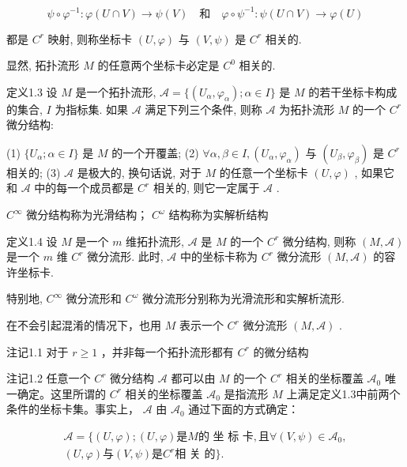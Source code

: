 $$
\psi \circ \varphi^ {- 1}: \varphi (U \cap V) \to \psi (V) \quad {\text {和}} \quad \varphi \circ \psi^ {- 1}: \psi (U \cap V) \to \varphi (U)
$$

都是  $C^r$  映射, 则称坐标卡  $(U,\varphi)$  与  $(V,\psi)$  是  $C^r$  相关的.

显然, 拓扑流形  $M$  的任意两个坐标卡必定是  $C^0$  相关的.

定义1.3 设  $M$  是一个拓扑流形,  $\mathcal{A} = \{(U_{\alpha}, \varphi_{\alpha}) ; \alpha \in I\}$  是  $M$  的若干坐标卡构成的集合,  $I$  为指标集. 如果  $\mathcal{A}$  满足下列三个条件, 则称  $\mathcal{A}$  为拓扑流形  $M$  的一个  $C^r$  微分结构:

(1)  $\{U_{\alpha}; \alpha \in I\}$  是  $M$  的一个开覆盖;  
(2)  $\forall \alpha, \beta \in I, (U_{\alpha}, \varphi_{\alpha})$  与  $(U_{\beta}, \varphi_{\beta})$  是  $C^r$  相关的;  
(3)  $\mathcal{A}$  是极大的, 换句话说, 对于  $M$  的任意一个坐标卡  $(U, \varphi)$ , 如果它和  $\mathcal{A}$  中的每一个成员都是  $C^r$  相关的, 则它一定属于  $\mathcal{A}$ .

$C^\infty$  微分结构称为光滑结构；  $C^\omega$  结构称为实解析结构

定义1.4 设  $M$  是一个  $m$  维拓扑流形,  $\mathcal{A}$  是  $M$  的一个  $C^r$  微分结构, 则称  $(M, \mathcal{A})$  是一个  $m$  维  $C^r$  微分流形. 此时,  $\mathcal{A}$  中的坐标卡称为  $C^r$  微分流形  $(M, \mathcal{A})$  的容许坐标卡.

特别地,  $C^\infty$  微分流形和  $C^\omega$  微分流形分别称为光滑流形和实解析流形.

在不会引起混淆的情况下，也用  $M$  表示一个  $C^r$  微分流形  $(M, \mathcal{A})$ .

注记1.1 对于  $r \geqslant 1$ ，并非每一个拓扑流形都有  $C^r$  的微分结构

注记1.2 任意一个  $C^r$  微分结构  $\mathcal{A}$  都可以由  $M$  的一个  $C^r$  相关的坐标覆盖  $\mathcal{A}_0$  唯一确定。这里所谓的  $C^r$  相关的坐标覆盖  $\mathcal{A}_0$  是指流形  $M$  上满足定义1.3中前两个条件的坐标卡集。事实上， $\mathcal{A}$  由  $\mathcal{A}_0$  通过下面的方式确定：

$$
\begin{array}{l} \mathcal {A} = \{(U, \varphi); (U, \varphi) \text {是} M   \text {的 坐 标 卡},   \text {且}   \forall (V, \psi) \in \mathcal {A} _ {0}, \\ (U, \varphi) \text {与} (V, \psi) \text {是} C ^ {r} \text {相 关 的} \}. \\ \end{array}
$$


